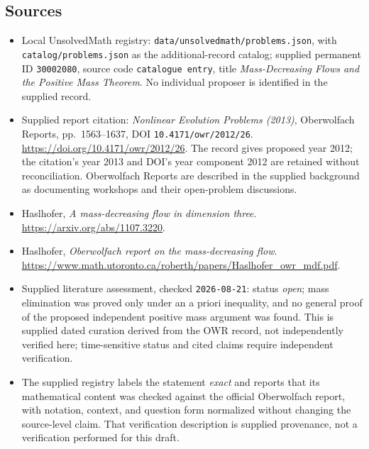 \documentclass[11pt]{article}
\begin{document}
\subsection{Sources}
\begin{itemize}
\item Local UnsolvedMath registry: \texttt{data/unsolvedmath/problems.json}, with \texttt{catalog/problems.json} as the additional-record catalog; supplied permanent ID \texttt{30002080}, source code \texttt{catalogue entry}, title \emph{Mass-Decreasing Flows and the Positive Mass Theorem}. No individual proposer is identified in the supplied record.
\item Supplied report citation: \emph{Nonlinear Evolution Problems (2013)}, Oberwolfach Reports, pp.\ 1563--1637, DOI \texttt{10.4171/owr/2012/26}. \url{https://doi.org/10.4171/owr/2012/26}. The record gives proposed year 2012; the citation's year 2013 and DOI's year component 2012 are retained without reconciliation. Oberwolfach Reports are described in the supplied background as documenting workshops and their open-problem discussions.
\item Haslhofer, \emph{A mass-decreasing flow in dimension three}. \url{https://arxiv.org/abs/1107.3220}.
\item Haslhofer, \emph{Oberwolfach report on the mass-decreasing flow}. \url{https://www.math.utoronto.ca/roberth/papers/Haslhofer_owr_mdf.pdf}.
\item Supplied literature assessment, checked \texttt{2026-08-21}: status \emph{open}; mass elimination was proved only under an a priori inequality, and no general proof of the proposed independent positive mass argument was found. This is supplied dated curation derived from the OWR record, not independently verified here; time-sensitive status and cited claims require independent verification.
\item The supplied registry labels the statement \emph{exact} and reports that its mathematical content was checked against the official Oberwolfach report, with notation, context, and question form normalized without changing the source-level claim. That verification description is supplied provenance, not a verification performed for this draft.
\end{itemize}
\end{document}
